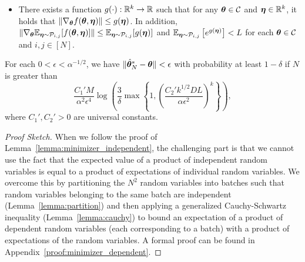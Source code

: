 \begin{lemma}
\begin{itemize}[leftmargin=3.5mm]
\begin{equation*}
\end{equation*}
\item There exists a function $g(\cdot): \mathbb{R}^k \rightarrow \mathbb{R}$ such that for any ${\bm{\theta}} \in \mathcal{C}$ and ${\bm{\eta}} \in \mathbb{R}^k$, it holds that  $\lVert \nabla_{\bm{\theta}} f({\bm{\theta}},{\bm{\eta}}) \rVert \leq g({\bm{\eta}})$. In addition,  $\lVert \nabla_{\bm{\theta}} \mathbb{E}_{{\bm{\eta}} \sim \mathcal{P}_{i,j}}[f({\bm{\theta}}, {\bm{\eta}})]\rVert \leq \mathbb{E}_{{\bm{\eta}} \sim \mathcal{P}_{i,j}}[g({\bm{\eta}})]$ and $\mathbb{E}_{{\bm{\eta}} \sim \mathcal{P}_{i,j}}\left[ e^{g({\bm{\eta}})}\right]< L$ for each ${\bm{\theta}} \in \mathcal{C}$ and  $i,j \in [N]$.
\end{itemize}
For each $0<\epsilon< \alpha^{-1/2}$, we have $\lVert \hat{{\bm{\theta}}}_N^* - {\bm{\theta}} \rVert < \epsilon$ with probability at least $1- \delta$  if $N$ is greater than
\begin{equation*}
\frac{C_1' M}{ \alpha^2 \epsilon^4} \log\left(\frac{3}{\delta} \max \left \{1, \left(\frac{C_2' k^{1/2} D  L}{\alpha \epsilon^2 }\right)^k \right\} \right),
\end{equation*}
where $C_1', C_2'>0$ are universal constants.
\end{lemma}
\begin{proof}[Proof Sketch]
When we follow the proof of Lemma~\ref{lemma:minimizer_independent}, the challenging part is that we cannot use the fact that the expected value of a product of independent random variables is equal to a product of expectations of individual random variables. We overcome this by partitioning the $N^2$ random variables into batches such that random variables belonging to the same batch are independent (Lemma~\ref{lemma:partition}) and then applying a generalized Cauchy-Schwartz inequality (Lemma~\ref{lemma:cauchy}) to bound an expectation of a product of dependent random variables (each corresponding to a batch) with a product of expectations of the random variables. A formal proof can be found in Appendix~\ref{proof:minimizer_dependent}. 
\end{proof}

